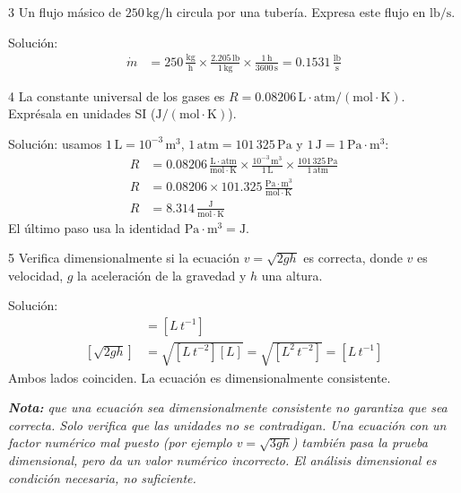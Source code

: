 \begin{exercise}{3}{}
Un flujo másico de $250\,\mathrm{kg/h}$ circula por una tubería.
Expresa este flujo en $\mathrm{lb/s}$.

Solución:
\begin{align*}
\dot m &= 250\,\frac{\mathrm{kg}}{\mathrm{h}}
\times \frac{2.205\,\mathrm{lb}}{1\,\mathrm{kg}}
\times \frac{1\,\mathrm{h}}{3600\,\mathrm{s}}
= 0.1531\,\frac{\mathrm{lb}}{\mathrm{s}}
\end{align*}
\end{exercise}

\begin{exercise}{4}{}
La constante universal de los gases es
$R = 0.08206\,\mathrm{L\cdot atm/(mol\cdot K)}$. Exprésala en
unidades SI ($\mathrm{J/(mol\cdot K)}$).

Solución: usamos $1\,\mathrm{L} = 10^{-3}\,\mathrm{m^3}$,
$1\,\mathrm{atm} = 101\,325\,\mathrm{Pa}$ y
$1\,\mathrm{J} = 1\,\mathrm{Pa\cdot m^3}$:
\begin{align*}
R &= 0.08206\,\frac{\mathrm{L\cdot atm}}{\mathrm{mol\cdot K}}
\times \frac{10^{-3}\,\mathrm{m^3}}{1\,\mathrm{L}}
\times \frac{101\,325\,\mathrm{Pa}}{1\,\mathrm{atm}} \\[4pt]
R &= 0.08206 \times 101.325\,\frac{\mathrm{Pa\cdot m^3}}{\mathrm{mol\cdot K}} \\[4pt]
R &= 8.314\,\frac{\mathrm{J}}{\mathrm{mol\cdot K}}
\end{align*}
El último paso usa la identidad $\mathrm{Pa\cdot m^3} =
\mathrm{J}$.
\end{exercise}

\begin{exercise}{5}{}
Verifica dimensionalmente si la ecuación $v = \sqrt{2 g h}$ es
correcta, donde $v$ es velocidad, $g$ la aceleración de la gravedad
y $h$ una altura.

Solución:
\begin{align*}
[v] &= [L\,t^{-1}] \\[4pt]
\left[\sqrt{2 g h}\right] &= \sqrt{[L\,t^{-2}][L]} = \sqrt{[L^2\,t^{-2}]}
= [L\,t^{-1}]
\end{align*}
Ambos lados coinciden. La ecuación es dimensionalmente consistente.

{\small\itshape
\textbf{Nota:} que una ecuación sea dimensionalmente consistente no
garantiza que sea correcta. Solo verifica que las unidades no se
contradigan. Una ecuación con un factor numérico mal puesto (por
ejemplo $v = \sqrt{3 g h}$) también pasa la prueba dimensional, pero
da un valor numérico incorrecto. El análisis dimensional es condición
necesaria, no suficiente.
}
\end{exercise}

